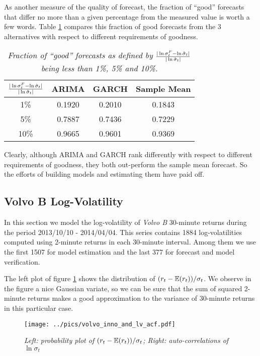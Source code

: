 As another measure of the quality of forecast, the fraction of
``good'' forecasts that differ no more than a given percentage from
the measured value is worth a few words. Table
\ref{tab:nordea_good_percentage} compares this fraction of good
forecasts from the 3 alternatives with respect to different
requirements of goodness.
\begin{table}[htb!]
  \centering
  \begin{tabular}{|c|c|c|c|}
    \hline
    ${|\ln \sigma^F_t - \ln \hat{\sigma}_t| \over |\ln
      \hat{\sigma}_t|}$ &
    ARIMA & GARCH & Sample Mean \\
    \hline
    1\% & 0.1920 & 0.2010 & 0.1843 \\
    \hline
    5\% & 0.7887 & 0.7436 & 0.7229 \\
    \hline
    10\% & 0.9665 & 0.9601 & 0.9369 \\
    \hline
  \end{tabular}
  \caption{\small \it Fraction of ``good'' forecasts as defined by
    ${|\ln \sigma^F_t - \ln \hat{\sigma}_t| \over |\ln
      \hat{\sigma}_t|}$ being less than 1\%, 5\% and 10\%.}
  \label{tab:nordea_good_percentage}
\end{table}
Clearly, although ARIMA and GARCH rank differently with respect to
different requirements of goodness, they both out-perform the sample
mean forecast. So the efforts of building models and estimating them
have paid off.
\subsection{Volvo B Log-Volatility}\label{sec:volvo}
In this section we model the log-volatility of {\it Volvo B} 30-minute
returns during the period 2013/10/10 - 2014/04/04. This series
contains 1884 log-volatilities computed using 2-minute returns in each
30-minute interval. Among them we use the first 1507 for model
estimation and the last 377 for forecast and model verification.

The left plot of figure \ref{fig:volvo_inno_and_lv_acf} shows the
distribution of $(r_t - \mathbb{E}(r_t))/\sigma_t$. We observe in the figure a
nice Gaussian variate, so we can be sure that the sum of squared
2-minute returns makes a good approximation to the variance of
30-minute returns in this particular case.
\begin{figure}[htb!]
  \centering
    \texttt{[image: ../pics/volvo\_inno\_and\_lv\_acf.pdf]}
    \label{fig:volvo_inno_and_lv_acf}
  \caption{\small \it Left: probability plot of $(r_t -
    \mathbb{E}(r_t))/\sigma_t$; Right: auto-correlations of $\ln \sigma_t$}
\end{figure}


